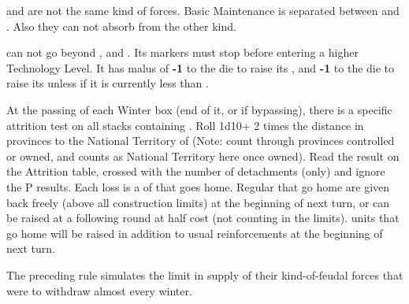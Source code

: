 \bparag \Janissaire and \Timar are not the same kind of forces.  Basic
Maintenance is separated between \Janissaire and \Timar.  Also they can not
absorb \LD from the other kind.

\label{chSpecific:Turkey:Army Tech}
\TUR can not go beyond  \TMUS, and  \TBAT. Its markers must stop before entering a higher Technology
Level.  It has malus of {\bf -1} to the die to raise its , and {\bf -1} to the die to raise its 
unless if it is currently less than \TARQ.




\label{chSpecific:Turkey:Yearly Campaigning}
At the passing of each Winter box (end of it, or if bypassing), there
is a specific attrition test on all stacks containing \Timar.
\bparag Roll 1d10+ 2 times the distance in provinces to the National
Territory of \TUR (Note: count through provinces controlled or owned,
 and  counts as National Territory here once
owned).
\bparag Read the result on the Attrition table, crossed with the number
of \Timar detachments (only) and ignore the P results.
\bparag Each loss is a \LD of \Timar that goes home.  Regular \Timar \LD
that go home are given back freely (above all construction limits) at
the beginning of next turn, or can be raised at a following round at
half cost (not counting in the limits).  \Pasha units that go home will
be raised in addition to usual reinforcements at the beginning of next
turn.

\begin{designnote}
  The preceding rule simulates the limit in supply of their
  kind-of-feudal forces that were to withdraw almost every winter.
\end{designnote}

